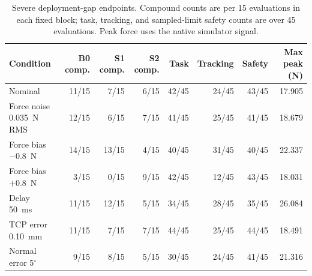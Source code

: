 \begin{table}[t]
\centering
\caption{Severe deployment-gap endpoints. Compound counts are per 15 evaluations in each fixed block; task, tracking, and sampled-limit safety counts are over 45 evaluations. Peak force uses the native simulator signal.}
\label{tab:deployment_gap_endpoints}
\scriptsize
\begin{tabular}{lrrrrrrr}
\toprule
Condition & B0 comp. & S1 comp. & S2 comp. & Task & Tracking & Safety & Max peak (N) \\
\midrule
Nominal & 11/15 & 7/15 & 6/15 & 42/45 & 24/45 & 43/45 & 17.905 \\
Force noise 0.035~N RMS & 12/15 & 6/15 & 7/15 & 41/45 & 25/45 & 41/45 & 18.679 \\
Force bias $-0.8$~N & 14/15 & 13/15 & 4/15 & 40/45 & 31/45 & 40/45 & 22.337 \\
Force bias $+0.8$~N & 3/15 & 0/15 & 9/15 & 42/45 & 12/45 & 43/45 & 18.031 \\
Delay 50~ms & 11/15 & 12/15 & 5/15 & 34/45 & 28/45 & 35/45 & 26.084 \\
TCP error 0.10~mm & 11/15 & 7/15 & 7/15 & 44/45 & 25/45 & 44/45 & 18.491 \\
Normal error 5$^{\circ}$ & 9/15 & 8/15 & 5/15 & 30/45 & 24/45 & 41/45 & 21.316 \\
\bottomrule
\end{tabular}
\end{table}
